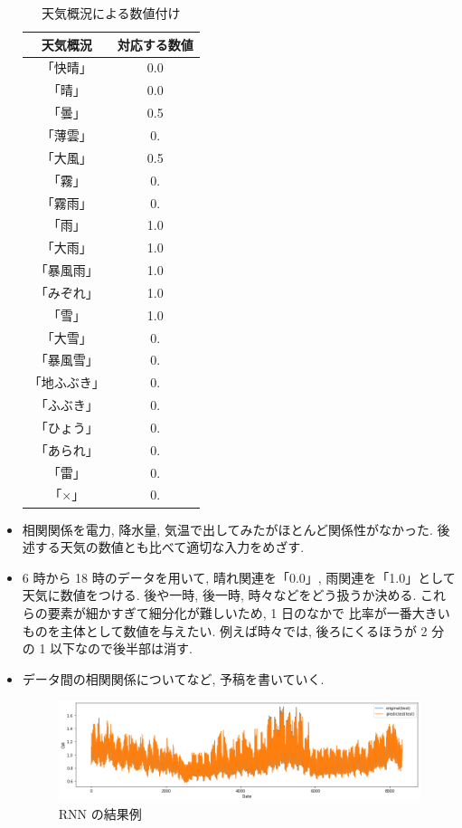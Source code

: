 \begin{itemize}
\begin{table}[!t]
  \caption{天気概況による数値付け}
  \begin{tabular}{|c|c|} \hline
    天気概況 & 対応する数値 \\ \hline
    「快晴」 & 0.0 \\ \hline
    「晴」 & 0.0 \\ \hline
    「曇」 & 0.5 \\ \hline
    「薄雲」 & 0. \\ \hline
    「大風」 & 0.5 \\ \hline
    「霧」 & 0. \\ \hline
    「霧雨」 & 0. \\ \hline
    「雨」 & 1.0 \\ \hline
    「大雨」 & 1.0 \\ \hline
    「暴風雨」 & 1.0 \\ \hline
    「みぞれ」 & 1.0 \\ \hline
    「雪」 & 1.0 \\ \hline
    「大雪」 & 0. \\ \hline
    「暴風雪」 & 0. \\ \hline
    「地ふぶき」 & 0. \\ \hline
    「ふぶき」 & 0. \\ \hline
    「ひょう」 & 0. \\ \hline
    「あられ」 & 0. \\ \hline
    「雷」 & 0. \\ \hline
    「×」 & 0. \\ \hline
  \end{tabular}
\end{table}
        \item 相関関係を電力, 降水量, 気温で出してみたがほとんど関係性がなかった. 後述する天気の数値とも比べて適切な入力をめざす.
        \item 6 時から 18 時のデータを用いて, 晴れ関連を「0.0」, 雨関連を「1.0」として天気に数値をつける. 後や一時, 後一時, 時々などをどう扱うか決める. これらの要素が細かすぎて細分化が難しいため, 1 日のなかで 比率が一番大きいものを主体として数値を与えたい. 例えば時々では, 後ろにくるほうが 2 分の 1 以下なので後半部は消す.
        \item データ間の相関関係についてなど, 予稿を書いていく. 

\begin{figure}[phb]
\centering
\includegraphics[scale=0.5]{kekka.png}
\caption{RNN の結果例}
\end{figure}
\end{itemize}

